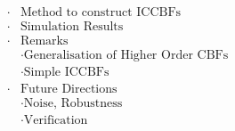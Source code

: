 \documentclass[preview]{standalone}
\begin{document}
\begin{align*}
\cdot & \text{Method to construct ICCBFs}\\ \cdot &\text{Simulation Results}\\ \cdot &\text{Remarks}\\ &\cdot \text{Generalisation of Higher Order CBFs}\\ &\cdot \text{Simple ICCBFs}\\ \cdot & \text{Future Directions}\\ &\cdot \text{Noise, Robustness}\\ &\cdot \text{Verification}\\
\end{align*}
\end{document}
